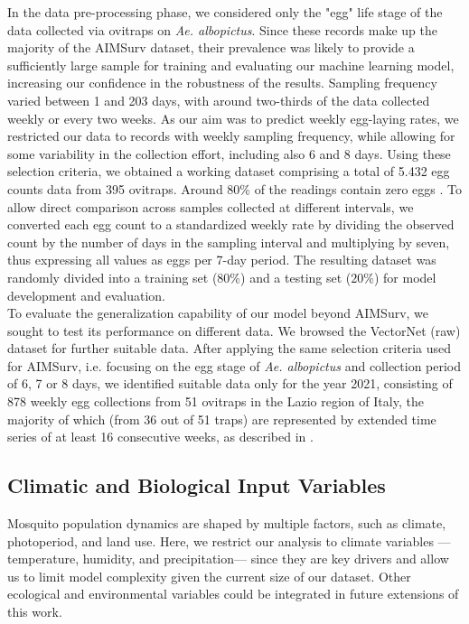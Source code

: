 \documentclass[preprint,12pt]{elsarticle}
\begin{document}
In the data pre-processing phase, we considered only the "egg" life stage of the data collected via ovitraps on \emph{Ae. albopictus}. Since these records make up the majority of the AIMSurv dataset, their prevalence was likely to provide a sufficiently large sample for training and evaluating our machine learning model, increasing our confidence in the robustness of the results. Sampling frequency varied between 1 and 203 days, with around two-thirds of the data collected weekly or every two weeks.
As our aim was to predict weekly egg-laying rates, we restricted our data to records with weekly sampling frequency, while allowing for some variability in the collection effort, including also 6 and 8 days. Using these selection criteria, we obtained a working dataset comprising a total of 5.432 egg counts data from 395 ovitraps. Around 80\% of the readings contain zero eggs \cite{biazzo2026_datasets}. To allow direct comparison across samples collected at different intervals, we converted each egg count to a standardized weekly rate by dividing the observed count by the number of days in the sampling interval and multiplying by seven, thus expressing all values as eggs per 7-day period. The resulting dataset was randomly divided into a training set ($80\%$) and a testing set ($20\%$) for model development and evaluation.\\

To evaluate the generalization capability of our model beyond AIMSurv, we sought to test its performance on different data. We browsed the VectorNet (raw) dataset \cite{VectorNet2025} for further suitable data. After applying the same selection criteria used for AIMSurv, i.e. focusing on the egg stage of \emph{Ae. albopictus} and collection period of 6, 7 or 8 days, we identified suitable data only for the year 2021, consisting of 878 weekly egg collections from 51 ovitraps in the Lazio region of Italy, the majority of which (from 36 out of 51 traps) are represented by extended time series of at least 16 consecutive weeks, as described in \cite{Romiti2022}.

\subsection{Climatic and Biological Input Variables}

Mosquito population dynamics are shaped by multiple factors, such as climate, photoperiod, and land use. Here, we restrict our analysis to climate variables —temperature, humidity, and precipitation— since they are key drivers \cite{zardini2024, Steindorf2025} and allow us to limit model complexity given the current size of our dataset. Other ecological and environmental variables could be integrated in future extensions of this work.
\end{document}
